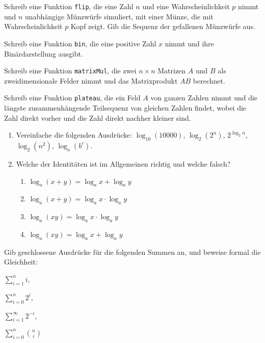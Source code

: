 \documentclass{uebung_cs}
\begin{document}
\begin{aufgabe}
    Schreib eine Funktion \texttt{flip}, die eine Zahl $n$ und eine Wahrscheinlichkeit $p$ nimmt und $n$ unabhängige Münzwürfe simuliert, mit einer Münze, die mit Wahrscheinlichkeit $p$ Kopf zeigt. Gib die Sequenz der gefallenen Münzwürfe aus.
\end{aufgabe}

\begin{aufgabe}[Binärzahlen]
    Schreib eine Funktion \texttt{bin}, die eine positive Zahl $x$ nimmt und ihre Binärdarstellung ausgibt.
\end{aufgabe}

\begin{aufgabe}[Matrixmultiplikation]
    Schreib eine Funktion \texttt{matrixMul}, die zwei $n\times n$ Matrizen $A$ und $B$ als zweidimensionale Felder nimmt und das Matrixprodukt $AB$ berechnet.
\end{aufgabe}

\begin{aufgabe}
    Schreib eine Funktion \texttt{plateau}, die ein Feld $A$ von ganzen Zahlen nimmt und die längste zusammenhängende Teilsequenz von gleichen Zahlen findet, wobei die Zahl direkt vorher und die Zahl direkt nachher kleiner sind.
\end{aufgabe}

\begin{aufgabe}[Logarithmus]\mbox{}
    \begin{enumerate}
        \item Vereinfache die folgenden Ausdrücke:
        $\log_{10}(10000)$,\;
        $\log_2(2^n)$,\;
        $2^{\log_2 n}$,\;
        $\log_2(n^2)$,\;
        $\log_a(b^c)$.
        \item Welche der Identitäten ist im Allgemeinen richtig und welche falsch?
        \begin{enumerate}[1)]
            \item $\log_a(x+y)= \log_a x+ \log_a y$
            \item $\log_a(x+y)= \log_a x \cdot \log_a y$
            \item $\log_a(xy)= \log_a x\cdot \log_a y$
            \item $\log_a(xy)= \log_a x+ \log_a y$
        \end{enumerate}
    \end{enumerate}
\end{aufgabe}

\begin{aufgabe}[Summen]
    Gib geschlossene Ausdrücke für die folgenden Summen an, und beweise formal die Gleichheit:
    \begin{enumerate*}[(a)]
        \item $\sum_{i=1}^n i$,\;
        \item $\sum_{i=0}^n 2^{i}$,\;
        \item $\sum_{i=1}^\infty 2^{-i}$,\;
        \item $\sum_{i=0}^n \binom{n}{i}$
    \end{enumerate*}
\end{aufgabe}
\end{document}

